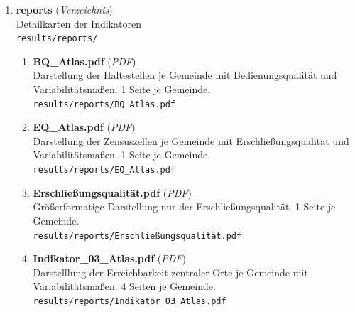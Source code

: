 \begin{enumerate}[label=A\arabic*, ref=A\arabic*, leftmargin=*, itemsep=0.5em, topsep=0.3em]
\begin{enumerate}[label=A\arabic{enumi}-\arabic*, ref=A\arabic{enumi}-\arabic*, leftmargin=*, itemsep=0.5em, topsep=0.3em]
\begin{enumerate}[label=A\arabic{enumi}-\arabic{enumii}-\arabic*, ref=A\arabic{enumi}-\arabic{enumii}-\arabic*, leftmargin=*, itemsep=0.5em, topsep=0.3em]
\begin{enumerate}[label=A\arabic{enumi}-\arabic{enumii}-\arabic{enumiii}-\arabic*, ref=A\arabic{enumi}-\arabic{enumii}-\arabic{enumiii}-\arabic*, leftmargin=*, itemsep=0.5em, topsep=0.3em]
\texttt{\small results/figures/perci3/Gemeinde\_tt\_i3-oz\_per\_hour.svg}
\edef\appendixlabelkey{app:A\arabic{enumi}-\arabic{enumii}-\arabic{enumiii}-\arabic{enumiv}}
\expandafter\label\expandafter{\appendixlabelkey}
\end{enumerate}
\end{enumerate}
\item \textbf{reports} \textnormal{(\textit{Verzeichnis})}\\
Detailkarten der Indikatoren\\
\texttt{\small results/reports/}
\edef\appendixlabelkey{app:A\arabic{enumi}-\arabic{enumii}}
\expandafter\label\expandafter{\appendixlabelkey}
\begin{enumerate}[label=A\arabic{enumi}-\arabic{enumii}-\arabic*, ref=A\arabic{enumi}-\arabic{enumii}-\arabic*, leftmargin=*, itemsep=0.5em, topsep=0.3em]
\item \textbf{BQ\_Atlas.pdf} \textnormal{(\textit{PDF})}\\
Darstellung der Haltestellen je Gemeinde mit Bedienungsqualität und Variabilitätsmaßen. 1 Seite je Gemeinde.\\
\texttt{\small results/reports/BQ\_Atlas.pdf}
\edef\appendixlabelkey{app:A\arabic{enumi}-\arabic{enumii}-\arabic{enumiii}}
\expandafter\label\expandafter{\appendixlabelkey}
\item \textbf{EQ\_Atlas.pdf} \textnormal{(\textit{PDF})}\\
Darstellung der Zensuszellen je Gemeinde mit Erschließungsqualität und Variabilitätsmaßen. 1 Seite je Gemeinde.\\
\texttt{\small results/reports/EQ\_Atlas.pdf}
\edef\appendixlabelkey{app:A\arabic{enumi}-\arabic{enumii}-\arabic{enumiii}}
\expandafter\label\expandafter{\appendixlabelkey}
\item \textbf{Erschließungsqualität.pdf} \textnormal{(\textit{PDF})}\\
Größerformatige Darstellung nur der Erschließungsqualität. 1 Seite je Gemeinde.\\
\texttt{\small results/reports/Erschließungsqualität.pdf}
\edef\appendixlabelkey{app:A\arabic{enumi}-\arabic{enumii}-\arabic{enumiii}}
\expandafter\label\expandafter{\appendixlabelkey}
\item \textbf{Indikator\_03\_Atlas.pdf} \textnormal{(\textit{PDF})}\\
Darstelllung der Erreichbarkeit zentraler Orte je Gemeinde mit Variabilitätsmaßen. 4 Seiten je Gemeinde.\\
\texttt{\small results/reports/Indikator\_03\_Atlas.pdf}

\end{enumerate}
\end{enumerate}
\end{enumerate}
